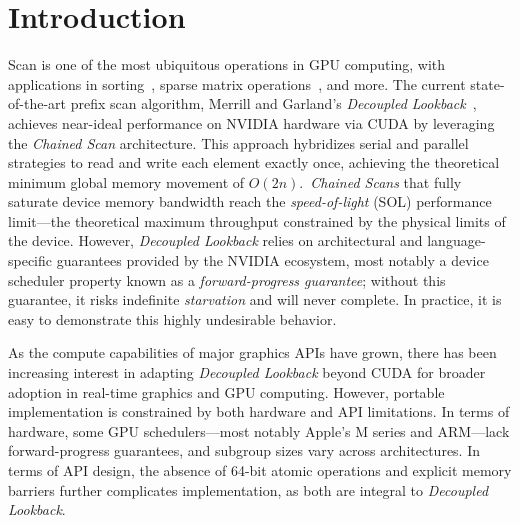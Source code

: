 \documentclass[sigconf,screen]{acmart}
\begin{document}


\maketitle

\section{Introduction}
Scan is one of the most ubiquitous operations in GPU computing, with applications in sorting~\cite{adinets2022onesweepfastersignificantdigit}, sparse matrix operations~\cite{BellGarland2009}, and more. The current state-of-the-art prefix scan algorithm, Merrill and Garland's \emph{Decoupled Lookback}~\cite{Merrill2016}, achieves near-ideal performance on NVIDIA hardware via CUDA by leveraging the \emph{Chained Scan} architecture. This approach hybridizes serial and parallel strategies to read and write each element exactly once, achieving the theoretical minimum global memory movement of $O(2n)$.\ \emph{Chained Scans} that fully saturate device memory bandwidth reach the \emph{speed-of-light} (SOL) performance limit---the theoretical maximum throughput constrained by the physical limits of the device. However, \emph{Decoupled Lookback} relies on architectural and language-specific guarantees provided by the NVIDIA ecosystem, most notably a device scheduler property known as a \emph{forward-progress guarantee}; without this guarantee, it risks indefinite \emph{starvation} and will never complete. In practice, it is easy to demonstrate this highly undesirable behavior.

As the compute capabilities of major graphics APIs have grown, there has been increasing interest in adapting \emph{Decoupled Lookback} beyond CUDA for broader adoption in real-time graphics and GPU computing. However, portable implementation is constrained by both hardware and API limitations. In terms of hardware, some GPU schedulers---most notably Apple's M series and ARM---lack forward-progress guarantees, and subgroup sizes vary across architectures. In terms of API design, the absence of 64-bit atomic operations and explicit memory barriers further complicates implementation, as both are integral to \emph{Decoupled Lookback}.
\end{document}
